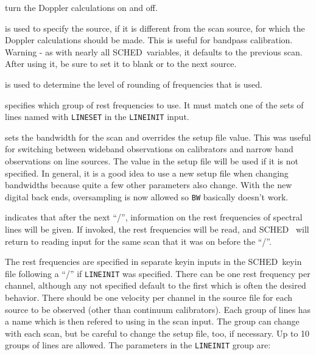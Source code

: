 \documentclass{report}
\newcommand{\sched}{{\sc SCHED}}
\newcommand{\schedb}{{\sc SCHED~}}
\begin{document}
\begin{list}{}{\parsep 0em  \itemsep 0em }
\item {} turn the
Doppler calculations on and off.

\item {} is used to specify the source,
if it is different from the scan source, for which the Doppler calculations
should be made.  This is useful for bandpass calibration.  Warning -
as with nearly all \sched\ variables, it defaults to the previous scan.
After using it, be sure to set it to blank or to the next source.

\item {} is used to determine the level
of rounding of frequencies that is used.

\item {} specifies which group of
rest frequencies to use. It must match one of the sets of lines
named with {\tt LINESET} in the {\tt LINEINIT} input.

\item {} sets the bandwidth for the scan and
overrides the setup file value.  This was useful for switching between
wideband observations on calibrators and narrow band observations on
line sources.  The value in the setup file will be used if it is
not specified.  In general, it is a good idea to use a new
setup file when changing bandwidths because quite a few other
parameters also change.  With the new digital back ends, oversampling
is now allowed so {\tt BW} basically doesn't work.


\item {} indicates that after the
next ``/'', information on the rest frequencies of spectral lines will
be given.  If invoked, the rest frequencies will be read, and \schedb
will return to reading input for the same scan that it was on before
the ``/''.

\end{list}

The rest frequencies are specified in separate keyin inputs in the
\schedb keyin file following a ``/'' if {\tt LINEINIT} was specified.
There can be one rest frequency per channel, although any not
specified default to the first which is often the desired
behavior. There should be one velocity per channel in the source file
for each source to be observed (other than continuum
calibrators). Each group of lines has a name which is then refered to
using  in the scan input. The
group can change with each scan, but be careful to change the setup
file, too, if necessary.  Up to 10 groups of lines are allowed. The
parameters in the {\tt LINEINIT} group are:
\end{document}
